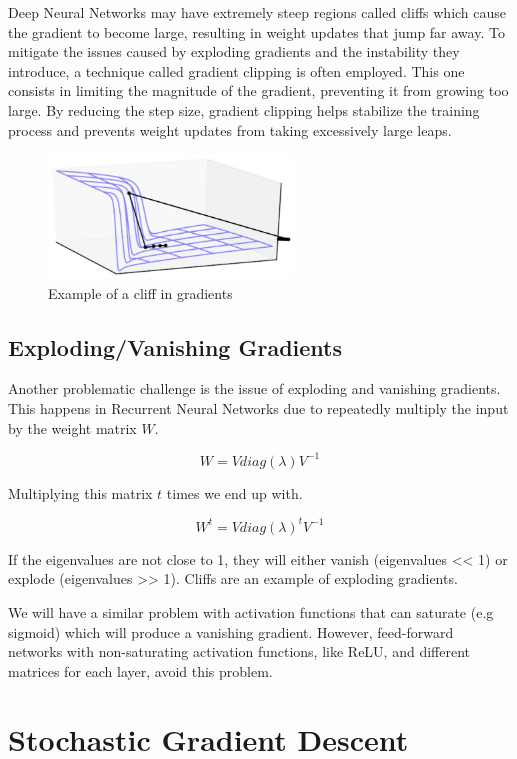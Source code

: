 Deep Neural Networks may have extremely steep regions called cliffs which cause the gradient to become large, resulting in weight updates that jump far away. To mitigate the issues caused by exploding gradients and the instability they introduce, a technique called gradient clipping is often employed. This one consists in limiting the magnitude of the gradient, preventing it from growing too large. By reducing the step size, gradient clipping helps stabilize the training process and prevents weight updates from taking excessively large leaps.

\begin{figure}[h]
    \centering
    \includegraphics[width=6.5cm]{Plots/cliffs.jpg}
    \caption{Example of a cliff in gradients}
    \label{fig:gradient-cliff}
\end{figure}

\subsection{Exploding/Vanishing Gradients}

Another problematic challenge is the issue of exploding and vanishing gradients. This happens in Recurrent Neural Networks due to repeatedly multiply the input by the weight matrix $W$.

$$ W = V diag(\lambda) V^{-1} $$

\noindent Multiplying this matrix $t$ times we end up with.

$$W^{t} = V {diag(\lambda)}^t V^{-1}$$

\noindent If the eigenvalues are not close to 1, they will either vanish (eigenvalues << 1) or explode (eigenvalues >> 1). Cliffs are an example of exploding gradients.

\noindent We will have a similar problem with activation functions that can saturate (e.g sigmoid) which will produce a vanishing gradient. However, feed-forward networks with non-saturating activation functions, like ReLU, and different matrices for each layer, avoid this problem.

\newpage

\section{Stochastic Gradient Descent}

